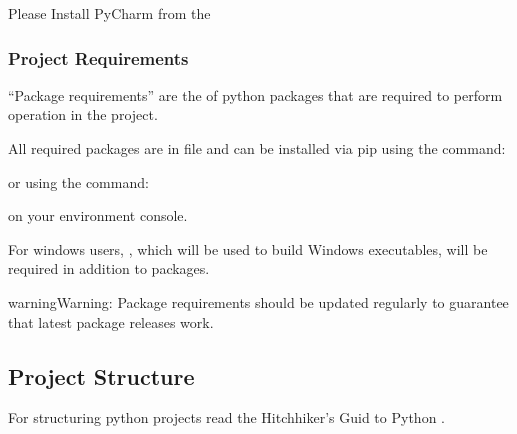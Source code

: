 \documentclass[letterpaper,10pt,english]{sphinxmanual}
\begin{document}
Please Install PyCharm from the 


\subsubsection{Project Requirements}
\label{\detokenize{env:project-requirements}}
“Package requirements” are the  of python packages that are required to perform 
operation in the project.

All required packages are in  file and can be installed via pip using the command:

\begin{sphinxVerbatim}[commandchars=\\\{\}]
   
\end{sphinxVerbatim}

or using the command:

\begin{sphinxVerbatim}[commandchars=\\\{\}]
 
\end{sphinxVerbatim}

on your environment console.

For windows users, , which will be used to build Windows executables, will be required in addition
to  packages.

\begin{sphinxadmonition}{warning}{Warning:}
Package requirements should be updated regularly to guarantee that latest package releases work.
\end{sphinxadmonition}


\subsection{Project Structure}
\label{\detokenize{structure:project-structure}}\label{\detokenize{structure::doc}}
For structuring python projects read the Hitchhiker’s Guid to Python .
\end{document}
